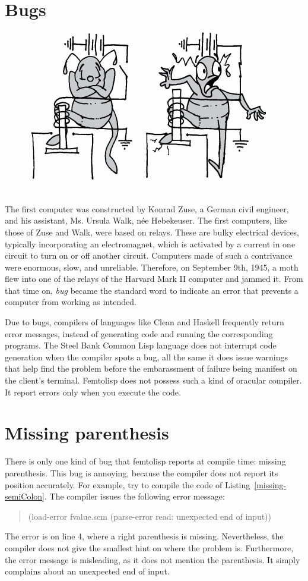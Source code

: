 \documentclass[a4paper,12pt]{book}
\begin{document}
\section{Bugs}
\begin{figure}
\includegraphics[scale=0.5]{fig-sets/bugcerto.png}
\end{figure}
The first computer was constructed by Konrad Zuse,
a German civil engineer, and his assistant,
Ms. Ursula Walk, née Hebekeuser.
The first computers, like those of Zuse and Walk,
were based on relays. These are
bulky electrical devices, typically incorporating
an electromagnet, which is activated by a current
in one circuit to turn on or off another circuit.
Computers made of such a contrivance were enormous,
slow, and unreliable. Therefore, on September 9th, 1945,
a moth flew into one of the relays of the Harvard  Mark II
computer and jammed it. From that time on,   {\em bug}
became the standard word to indicate
 an error that prevents a computer from working as intended.

 Due to bugs, compilers of languages like Clean
 and Haskell frequently return error messages,
 instead of generating code and running the
 corresponding programs. The Steel Bank Common Lisp language
 does not interrupt code generation when the
 compiler spots a bug, all the same
 it does issue warnings
 that help find the problem before the embarassment
 of failure being manifest on the client's terminal.
 Femtolisp does not possess such a kind of oracular
 compiler. It report errors only when you execute
 the code.


\section{Missing parenthesis}
There is only one kind of bug that femtolisp
reports at compile
time: missing parenthesis.
This bug  is annoying, because the compiler
does not  report its position accurately.
For example, try to compile the code of Listing~\ref{missing-semiColon}.
The compiler issues the
following error message:
\begin{quote}
(load-error fvalue.scm (parse-error read: unexpected end of input))
\end{quote}
The error is on line 4, where a right parenthesis is missing.
Nevertheless, the compiler does not give the smallest
hint on where the problem is. Furthermore, the
error message is misleading,
as it does not mention the parenthesis.
It simply complains about an unexpected end of input.
\end{document}
